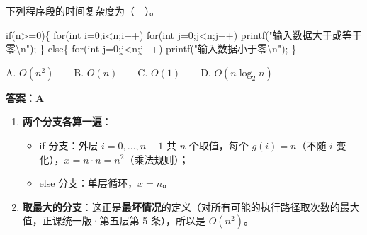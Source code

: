 \documentclass[10.5pt,a4paper,oneside]{article}
\newcommand{\hlred}[1]{\textcolor{wdred}{\bfseries #1}}
\providecommand{\tightlist}{\setlength{\itemsep}{2pt}\setlength{\parskip}{0pt}}
\newenvironment{Shaded}{}{}
\newcommand{\ControlFlowTok}[1]{\textcolor[rgb]{0.12,0.31,0.71}{#1}}
\newcommand{\DataTypeTok}[1]{\textcolor[rgb]{0.12,0.31,0.71}{#1}}
\newcommand{\DecValTok}[1]{\textcolor[rgb]{0.77,0.35,0.07}{#1}}
\newcommand{\NormalTok}[1]{#1}
\newcommand{\OperatorTok}[1]{\textcolor[rgb]{0.20,0.20,0.20}{#1}}
\newcommand{\SpecialCharTok}[1]{\textcolor[rgb]{0.63,0.19,0.43}{#1}}
\newcommand{\StringTok}[1]{\textcolor[rgb]{0.63,0.19,0.43}{#1}}
\begin{document}
\begin{questionbox}[09]

下列程序段的时间复杂度为（　）。

\begin{Shaded}
\begin{Highlighting}[]
\ControlFlowTok{if}\OperatorTok{(}\NormalTok{n}\OperatorTok{\textgreater{}=}\DecValTok{0}\OperatorTok{)\{}
    \ControlFlowTok{for}\OperatorTok{(}\DataTypeTok{int}\NormalTok{ i}\OperatorTok{=}\DecValTok{0}\OperatorTok{;}\NormalTok{i}\OperatorTok{\textless{}}\NormalTok{n}\OperatorTok{;}\NormalTok{i}\OperatorTok{++)}
        \ControlFlowTok{for}\OperatorTok{(}\DataTypeTok{int}\NormalTok{ j}\OperatorTok{=}\DecValTok{0}\OperatorTok{;}\NormalTok{j}\OperatorTok{\textless{}}\NormalTok{n}\OperatorTok{;}\NormalTok{j}\OperatorTok{++)}
\NormalTok{            printf}\OperatorTok{(}\StringTok{"输入数据大于或等于零}\SpecialCharTok{\textbackslash{}n}\StringTok{"}\OperatorTok{);}
\OperatorTok{\}}
\ControlFlowTok{else}\OperatorTok{\{}
    \ControlFlowTok{for}\OperatorTok{(}\DataTypeTok{int}\NormalTok{ j}\OperatorTok{=}\DecValTok{0}\OperatorTok{;}\NormalTok{j}\OperatorTok{\textless{}}\NormalTok{n}\OperatorTok{;}\NormalTok{j}\OperatorTok{++)}
\NormalTok{        printf}\OperatorTok{(}\StringTok{"输入数据小于零}\SpecialCharTok{\textbackslash{}n}\StringTok{"}\OperatorTok{);}
\OperatorTok{\}}
\end{Highlighting}
\end{Shaded}

A. \(O(n^2)\)　　B. \(O(n)\)　　C. \(O(1)\)　　D. \(O(n\log_2 n)\)

\end{questionbox}

\hlred{\textbf{答案：A}}

\begin{enumerate}
\def\labelenumi{\arabic{enumi}.}
\tightlist
\item
  \textbf{两个分支各算一遍}：

  \begin{itemize}
  \tightlist
  \item
    if 分支：外层 \(i=0,\dots,n-1\) 共 \(n\) 个取值，每个
    \(g(i)=n\)（不随 \(i\) 变化），\(x=n\cdot n=n^2\)（乘法规则）；
  \item
    else 分支：单层循环，\(x=n\)。
  \end{itemize}
\item
  \textbf{取最大的分支}：这正是\textbf{最坏情况}的定义（对所有可能的执行路径取次数的最大值，正课统一版·第五层第
  5 条），所以是 \(O(n^2)\)。
\end{enumerate}
\end{document}
